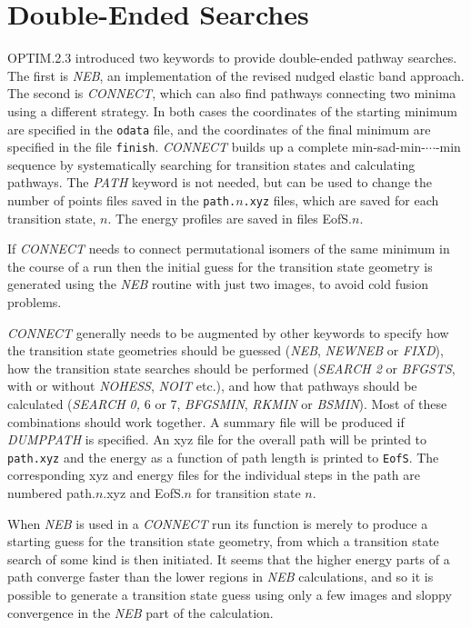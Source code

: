 \documentclass[12pt,a4paper,dvips]{article}
\begin{document}
\section{Double-Ended Searches}
\label{sec:double}
OPTIM.2.3 introduced two keywords to provide double-ended pathway searches.
The first is {\it NEB\/}, 
an implementation of the revised nudged elastic band approach.\cite{HenkelmanJ00,HenkelmanUJ00}
The second is {\it CONNECT\/}, which can also find pathways connecting two minima using a different
strategy. In both cases the coordinates of the starting minimum are specified in the {\tt odata} file,
and the coordinates of the final minimum are specified in the file {\tt finish}.
{\it CONNECT\/} builds up a complete min-sad-min-$\cdots$-min sequence by systematically 
searching for transition
states and calculating pathways. The {\it PATH\/} keyword is not needed, but can be used to change the
number of points files saved in the {\tt path.$n$.xyz} files, which are saved for each transition state, $n$.
The energy profiles are saved in files EofS.$n$.

If {\it CONNECT\/} needs to connect permutational isomers of the same minimum in the
course of a run then the initial guess for the transition state geometry is generated
using the {\it NEB\/} routine with just two images, to avoid cold fusion problems.

{\it CONNECT\/} generally needs to be augmented by other keywords to specify how the transition
state geometries should be guessed ({\it NEB\/},
{\it NEWNEB\/} or {\it FIXD\/}), how the transition
state searches should be performed ({\it SEARCH 2\/} or {\it BFGSTS\/}, with or
without {\it NOHESS\/}, {\it NOIT\/} etc.), and how that pathways should be
calculated ({\it SEARCH 0,\/} 6 or 7, {\it BFGSMIN\/}, {\it RKMIN} or {\it BSMIN\/}).
Most of these combinations should work together.
A summary file will be produced if {\it DUMPPATH\/} is specified. An xyz file
for the overall path will be printed to {\tt path.xyz} and the energy as a
function of path length is printed to {\tt EofS}. The corresponding xyz and energy
files for the individual steps in the path are numbered path.$n$.xyz and EofS.$n$ for
transition state $n$.

When {\it NEB\/} is used in a {\it CONNECT\/} run its function is merely to produce a
starting guess for the transition state geometry, from which a transition state search
of some kind is then initiated. It seems that the higher energy parts of a path converge 
faster than the lower regions in {\it NEB\/} calculations, and so it is possible to generate
a transition state guess using only a few images and sloppy convergence in the {\it NEB\/}
part of the calculation.
\end{document}
